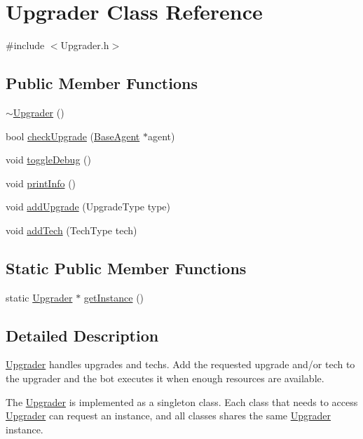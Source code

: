 \hypertarget{class_upgrader}{\section{Upgrader Class Reference}
\label{class_upgrader}
}


{\ttfamily \#include $<$Upgrader.\-h$>$}

\subsection*{Public Member Functions}
\begin{DoxyCompactItemize}
\item 
\hyperlink{class_upgrader_a31e43b9401ab4758c6a65d67bf727cff}{$\sim$\-Upgrader} ()
\item 
bool \hyperlink{class_upgrader_a63eb45a52f7efdfd434bc7853e0c55ea}{check\-Upgrade} (\hyperlink{class_base_agent}{Base\-Agent} $\ast$agent)
\item 
void \hyperlink{class_upgrader_ab5f18a1178c313ff7512a57499a3a891}{toggle\-Debug} ()
\item 
void \hyperlink{class_upgrader_a87f516bf9d509bf55ed9414351b7c1b6}{print\-Info} ()
\item 
void \hyperlink{class_upgrader_ad88f06daaeae32356e8265c07c17991c}{add\-Upgrade} (Upgrade\-Type type)
\item 
void \hyperlink{class_upgrader_a51bea1be8841797e45c16736f172fa66}{add\-Tech} (Tech\-Type tech)
\end{DoxyCompactItemize}
\subsection*{Static Public Member Functions}
\begin{DoxyCompactItemize}
\item 
static \hyperlink{class_upgrader}{Upgrader} $\ast$ \hyperlink{class_upgrader_ae0fac4149996571abf8b62d915fcabda}{get\-Instance} ()
\end{DoxyCompactItemize}


\subsection{Detailed Description}
\hyperlink{class_upgrader}{Upgrader} handles upgrades and techs. Add the requested upgrade and/or tech to the upgrader and the bot executes it when enough resources are available.

The \hyperlink{class_upgrader}{Upgrader} is implemented as a singleton class. Each class that needs to access \hyperlink{class_upgrader}{Upgrader} can request an instance, and all classes shares the same \hyperlink{class_upgrader}{Upgrader} instance.

